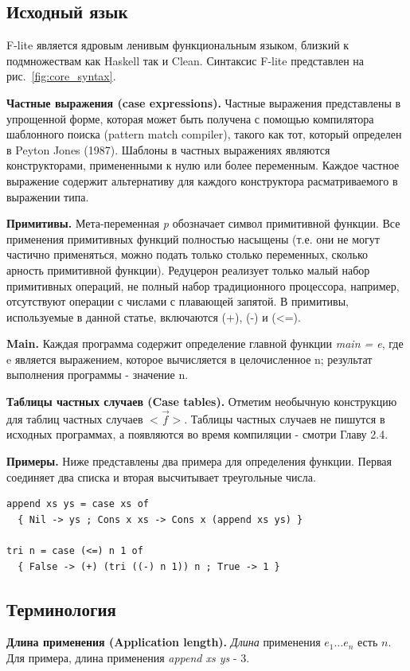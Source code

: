 \documentclass[flenqn, 14pt]{extarticle}
\begin{document}
\subsection{Исходный язык}
F-lite является ядровым ленивым функциональным языком, близкий к подмножествам как Haskell так и Clean. Синтаксис F-lite представлен на рис.~\ref{fig:core_syntax}.

\textbf{Частные выражения (case expressions).} Частные выражения представлены в упрощенной форме, которая может быть получена с помощью компилятора шаблонного поиска (pattern match compiler), такого как тот, который определен в Peyton Jones (1987). Шаблоны в частных выражениях являются конструкторами, примененными к нулю или более переменным. Каждое частное выражение содержит альтернативу для каждого конструктора расматриваемого в выражении типа.

\textbf{Примитивы.} Мета-переменная \textit{p} обозначает символ примитивной функции. Все применения примитивных функций полностью насыщены (т.е. они не могут частично применяться, можно подать только столько переменных, сколько арность примитивной функции). Редуцерон реализует только малый набор примитивных операций, не полный набор традиционного процессора, например, отсутствуют операции с числами с плавающей запятой. В примитивы, используемые в данной статье, включаются (+), (-) и (<=).

\textbf{Main.} Каждая программа содержит определение главной функции \textit{main = e}, где e является выражением, которое вычисляется в целочисленное n; результат выполнения программы - значение n.

\textbf{Таблицы частных случаев (Case tables).} Отметим необычную конструкцию для таблиц частных случаев $<\overrightarrow{f}>$. Таблицы частных случаев не пишутся в исходных программах, а появляются во время компиляции - смотри Главу 2.4.

\textbf{Примеры.} Ниже представлены два примера для определения функции. Первая соединяет два списка и вторая высчитывает треугольные числа.

\begin{verbatim}
append xs ys = case xs of
  { Nil -> ys ; Cons x xs -> Cons x (append xs ys) }
  
tri n = case (<=) n 1 of
  { False -> (+) (tri ((-) n 1)) n ; True -> 1 }
\end{verbatim}

\subsection{Терминология}
\textbf{Длина применения (Application length).} \textit{Длина} применения $e_1 \ldots e_n$ есть $n$. Для примера, длина применения \textit{append xs ys} - 3.
\end{document}
